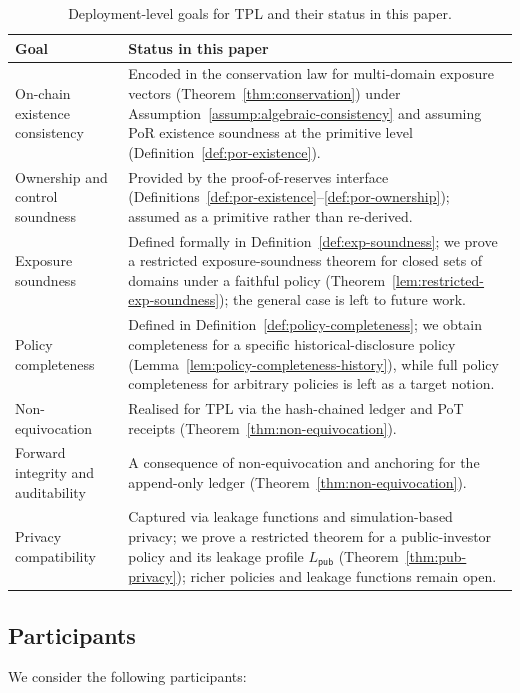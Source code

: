 \documentclass[11pt]{article}
\begin{document}
\begin{table}[h]
\centering
\begin{tabularx}{\linewidth}{lX}
\toprule
Goal & Status in this paper \\
\midrule
On-chain existence consistency & Encoded in the conservation law for multi-domain exposure vectors (Theorem~\ref{thm:conservation}) under Assumption~\ref{assump:algebraic-consistency} and assuming PoR existence soundness at the primitive level (Definition~\ref{def:por-existence}). \\
Ownership and control soundness & Provided by the proof-of-reserves interface (Definitions~\ref{def:por-existence}--\ref{def:por-ownership}); assumed as a primitive rather than re-derived. \\
Exposure soundness & Defined formally in Definition~\ref{def:exp-soundness}; we prove a restricted exposure-soundness theorem for closed sets of domains under a faithful policy (Theorem~\ref{lem:restricted-exp-soundness}); the general case is left to future work. \\
Policy completeness & Defined in Definition~\ref{def:policy-completeness}; we obtain completeness for a specific historical-disclosure policy (Lemma~\ref{lem:policy-completeness-history}), while full policy completeness for arbitrary policies is left as a target notion. \\
Non-equivocation & Realised for TPL via the hash-chained ledger and PoT receipts (Theorem~\ref{thm:non-equivocation}). \\
Forward integrity and auditability & A consequence of non-equivocation and anchoring for the append-only ledger (Theorem~\ref{thm:non-equivocation}). \\
Privacy compatibility & Captured via leakage functions and simulation-based privacy; we prove a restricted theorem for a public-investor policy and its leakage profile $L_{\mathsf{pub}}$ (Theorem~\ref{thm:pub-privacy}); richer policies and leakage functions remain open. \\
\bottomrule
\end{tabularx}
\caption{Deployment-level goals for TPL and their status in this paper.}
\label{tab:goals-status}
\end{table}

\subsection{Participants}

We consider the following participants:
\end{document}
